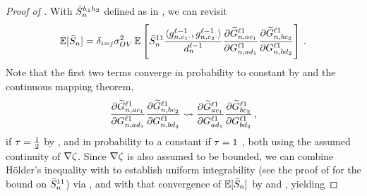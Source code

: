 \begin{proof}[Proof of ]
    With $\bar{S}_{n}^{h_1 h_2}$ defined as in , we can revisit  
    \begin{align*}
        \operatorname*{\mathbb{E}} [\bar{S}_{n}]
        =
        \delta_{i = j}
        \sigma_{O V}^2
        \operatorname*{\mathbb{E}} \left[
            \bar{S}_{n}^{1 1}
            \frac{
                \langle
                    g_{n, c_1 \cdot}^{\ell - 1}
                    ,
                    g_{n, c_2 \cdot}^{\ell - 1}
                \rangle
            }{
                d_{n}^{\ell - 1}
            }
            \frac{
                \partial
                \widetilde{G}_{n, a c_1}^{\ell 1}
            }{
                \partial 
                G_{n, a d_1}^{\ell 1}
            }
            \frac{
                \partial
                \widetilde{G}_{n, b c_2}^{\ell 1}
            }{
                \partial 
                G_{n, b d_2}^{\ell 1}
            }
        \right]
        \, .
    \end{align*}
    Note that the first two terms converge in probability to constant by  and the continuous mapping theorem, 
    $$
        \frac{
            \partial
            \widetilde{G}_{n, a c_1}^{\ell 1}
        }{
            \partial 
            G_{n, a d_1}^{\ell 1}
        }
        \frac{
            \partial
            \widetilde{G}_{n, b c_2}^{\ell 1}
        }{
            \partial 
            G_{n, b d_2}^{\ell 1}
        }
        \rightsquigarrow
        \frac{
            \partial
            \widetilde{G}_{a c_1}^{\ell 1}
        }{
            \partial 
            G_{a d_1}^{\ell 1}
        }
        \frac{
            \partial
            \widetilde{G}_{b c_2}^{\ell 1}
        }{
            \partial 
            G_{b d_2}^{\ell 1}
        }
        \, ,
    $$
    if $\tau = \frac{1}{2}$ by , and in probability to a constant if $\tau = 1$ \citep[appendix A]{yang2019v2}, both using the assumed continuity of $\nabla \zeta$.
    Since $\nabla \zeta$ is also assumed to be bounded, we can combine H{\" o}lder's inequality with  to establish uniform integrability (see the proof of  for the bound on $\bar{S}_{n}^{ 1 1 }$) via , and with that convergence of $\operatorname*{\mathbb{E}} [ \bar{S}_n ]$ by  and , yielding

\end{proof}
